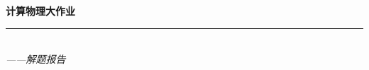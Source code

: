 \thispagestyle{empty}

\noindent\begin{minipage}{\textwidth}
\raggedleft
{\huge \bfseries 计算物理大作业}
\noindent\rule[-1ex]{\textwidth}{5pt}\\[2.5ex]
\hfill\emph{\Large ——解题报告}
\end{minipage}

\noindent{}


\begin{quote}\footnotesize
\end{quote}